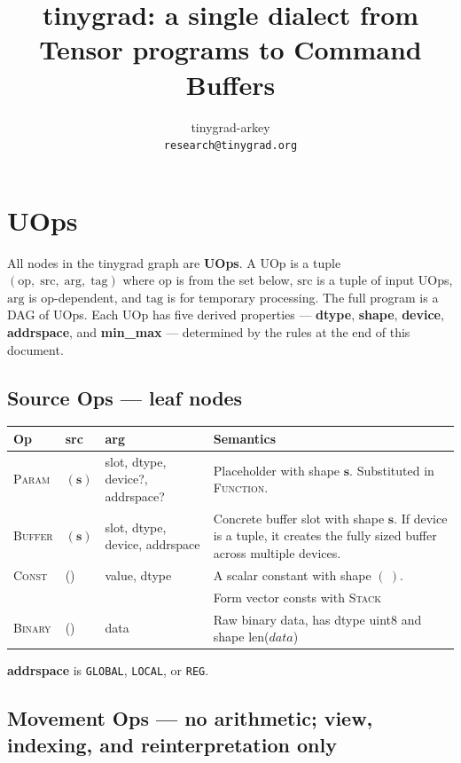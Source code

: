 \documentclass[10pt,letterpaper]{article}
\title{tinygrad: a single dialect from Tensor programs to Command Buffers}
\author{tinygrad-arkey \\ \texttt{research@tinygrad.org}}
\date{}
\newcommand{\op}[1]{\textsc{#1}}
\begin{document}
\maketitle
\thispagestyle{empty}

\section*{UOps}

All nodes in the tinygrad graph are \textbf{UOps}. A UOp is a tuple $(\mathrm{op},\;\mathrm{src},\;\mathrm{arg},\;\mathrm{tag})$ where $\mathrm{op}$ is from the set below, $\mathrm{src}$ is a tuple of input UOps, $\mathrm{arg}$ is op-dependent, and $\mathrm{tag}$ is for temporary processing. The full program is a DAG of UOps. Each UOp has five derived properties --- \textbf{dtype}, \textbf{shape}, \textbf{device}, \textbf{addrspace}, and \textbf{min\_max} --- determined by the rules at the end of this document.

\subsection*{Source Ops \normalfont\small--- leaf nodes}

\begin{tabular}{@{}l p{3.2cm} p{3.0cm} p{6.2cm}@{}}
\toprule
\textbf{Op} & \textbf{src} & \textbf{arg} & \textbf{Semantics} \\
\midrule
\op{Param} & $(\mathbf{s})$ & slot, dtype, device?, addrspace? &
  Placeholder with shape $\mathbf{s}$. Substituted in \op{Function}. \\[4pt]
\op{Buffer} & $(\mathbf{s})$ & slot, dtype, device, addrspace &
  Concrete buffer slot with shape $\mathbf{s}$. If device is a tuple, it creates the fully sized buffer across multiple devices. \\
\op{Const} & () & value, dtype &
  A scalar constant with shape $(\ )$. \\
  & & & Form vector consts with \op{Stack} \\
\op{Binary} & () & data & Raw binary data, has dtype uint8 and shape len($data$)  \\
\bottomrule
\end{tabular}

\smallskip
\textbf{addrspace} is \texttt{GLOBAL}, \texttt{LOCAL}, or \texttt{REG}.

\subsection*{{\color{movgreen}Movement Ops} \normalfont\small--- no arithmetic; view, indexing, and reinterpretation only}
\end{document}

